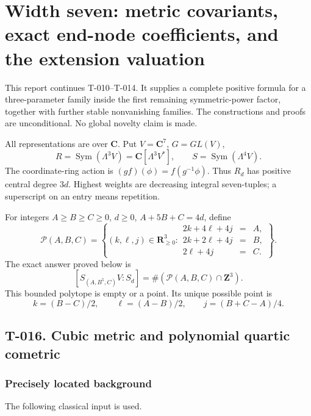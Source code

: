 \documentclass[
  10pt,
]{article}
\begin{document}
\section{Width seven: metric covariants, exact end-node coefficients,
and the extension
valuation}\label{width-seven-metric-covariants-exact-end-node-coefficients-and-the-extension-valuation}

This report continues T-010--T-014. It supplies a complete positive
formula for a three-parameter family inside the first remaining
symmetric-power factor, together with further stable nonvanishing
families. The constructions and proofs are unconditional. No global
novelty claim is made.

All representations are over \(\mathbf C\). Put \(V=\mathbf C^7\),
\(G=GL(V)\), \[
R=\operatorname{Sym}(\Lambda^3V)=\mathbf C[\Lambda^3V^*],
\qquad S=\operatorname{Sym}(\Lambda^4V).
\] The coordinate-ring action is \((gf)(\phi)=f(g^{-1}\phi)\). Thus
\(R_d\) has positive central degree \(3d\). Highest weights are
decreasing integral seven-tuples; a superscript on an entry means
repetition.

For integers \(A\ge B\ge C\ge0\), \(d\ge0\), \(A+5B+C=4d\), define \[
\mathcal P(A,B,C)=\left\{(k,\ell,j)\in\mathbf R_{\ge0}^3:
\begin{array}{rcl}
2k+4\ell+4j&=&A,\\
2k+2\ell+4j&=&B,\\
2\ell+4j&=&C.
\end{array}\right\}.
\] The exact answer proved below is \[
\boxed{[S_{(A,B^5,C)}V:S_d]
=\#(\mathcal P(A,B,C)\cap\mathbf Z^3).}
\tag{W7.1}
\] This bounded polytope is empty or a point. Its unique possible point
is \[
k=(B-C)/2,\qquad \ell=(A-B)/2,\qquad j=(B+C-A)/4.
\tag{W7.2}
\]

\subsection{T-016. Cubic metric and polynomial quartic
cometric}\label{t-016.-cubic-metric-and-polynomial-quartic-cometric}

\subsubsection{Precisely located
background}\label{precisely-located-background}

The following classical input is used.
\end{document}
